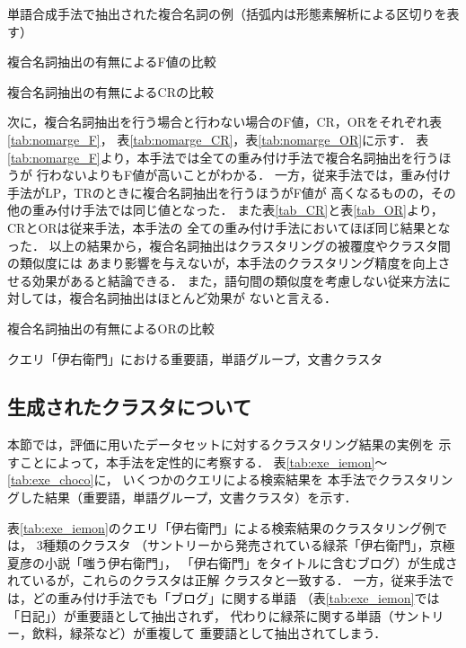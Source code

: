 \documentclass[japanese]{jnlp_1.4}
\begin{document}
{\begin{table}[b]
\caption{単語合成手法で抽出された複合名詞の例（括弧内は形態素解析による区切りを表す）} 
\label{tab:exe_WN}

\end{table}
\begin{table}[b]
    \caption{複合名詞抽出の有無によるF値の比較} \label{tab:nomarge_F}

\end{table}
\begin{table}[b]
    \caption{複合名詞抽出の有無によるCRの比較} \label{tab:nomarge_CR}

\end{table}

次に，複合名詞抽出を行う場合と行わない場合のF値，CR，ORをそれぞれ表{\ref{tab:nomarge_F}}，
表{\ref{tab:nomarge_CR}}，表{\ref{tab:nomarge_OR}}に示す．
表{\ref{tab:nomarge_F}}より，本手法では全ての重み付け手法で複合名詞抽出を行うほうが
行わないよりもF値が高いことがわかる．
一方，従来手法では，重み付け手法がLP，TRのときに複合名詞抽出を行うほうがF値が
高くなるものの，その他の重み付け手法では同じ値となった．
また表{\ref{tab_CR}}と表{\ref{tab_OR}}より，CRとORは従来手法，本手法の
全ての重み付け手法においてほぼ同じ結果となった．
以上の結果から，複合名詞抽出はクラスタリングの被覆度やクラスタ間の類似度には
あまり影響を与えないが，本手法のクラスタリング精度を向上させる効果があると結論できる．
また，語句間の類似度を考慮しない従来方法に対しては，複合名詞抽出はほとんど効果が
ないと言える．


\begin{table}[b]
    \caption{複合名詞抽出の有無によるORの比較} \label{tab:nomarge_OR}

\end{table}
\begin{table}[b]
    \caption{クエリ「伊右衛門」における重要語，単語グループ，文書クラスタ} \label{tab:exe_iemon}

\end{table}


\subsection{生成されたクラスタについて} \label{subsec:qualty}

本節では，評価に用いたデータセットに対するクラスタリング結果の実例を
示すことによって，本手法を定性的に考察する．
表{\ref{tab:exe_iemon}}〜{\ref{tab:exe_choco}}に，
いくつかのクエリによる検索結果を
本手法でクラスタリングした結果（重要語，単語グループ，文書クラスタ）を示す．

表{\ref{tab:exe_iemon}}のクエリ「伊右衛門」による検索結果のクラスタリング例では，
3種類のクラスタ
（サントリーから発売されている緑茶「伊右衛門」，京極夏彦の小説「嗤う伊右衛門」，
「伊右衛門」をタイトルに含むブログ）が生成されているが，これらのクラスタは正解
クラスタと一致する．
一方，従来手法では，どの重み付け手法でも「ブログ」に関する単語
（表{\ref{tab:exe_iemon}}では「日記」）が重要語として抽出されず，
代わりに緑茶に関する単語（サントリー，飲料，緑茶など）が重複して
重要語として抽出されてしまう．

}
\end{document}
